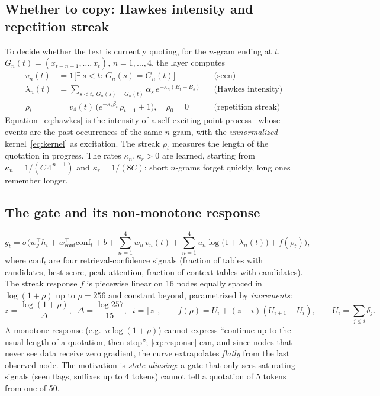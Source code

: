 \documentclass[11pt]{article}
\begin{document}
\subsection{Whether to copy: Hawkes intensity and repetition streak}
\label{sec:repetition}
To decide whether the text is currently quoting, for the $n$-gram ending at $t$, $G_n(t)=(x_{t-n+1},\dots,x_t)$,
$n=1,\dots,4$, the layer computes
\begin{align}
v_n(t)&=\mathbf{1}\big[\exists\,s<t:\,G_n(s)=G_n(t)\big] &&\text{(seen)}\\
\lambda_n(t)&=\sum_{s<t,\;G_n(s)=G_n(t)}\alpha_s\,e^{-\kappa_n(B_t-B_s)} &&\text{(Hawkes intensity)}\label{eq:hawkes}\\
\rho_t&=v_4(t)\,\big(e^{-\kappa_r\beta_t}\,\rho_{t-1}+1\big),\quad\rho_0=0 &&\text{(repetition streak)}\label{eq:streak}
\end{align}
Equation~\eqref{eq:hawkes} is the intensity of a self-exciting point process~\cite{hawkes1971spectra} whose events are
the past occurrences of the same $n$-gram, with the \emph{unnormalized} kernel~\eqref{eq:kernel} as excitation. The
streak $\rho_t$ measures the length of the quotation in progress. The rates $\kappa_n,\kappa_r>0$ are learned, starting
from $\kappa_n=1/(C\,4^{\,n-1})$ and $\kappa_r=1/(8C)$: short $n$-grams forget quickly, long ones remember longer.

\subsection{The gate and its non-monotone response}
\label{sec:gate}
\begin{equation}
g_t=\sigma\Big(w_g^\top h_t+w_{\mathrm{conf}}^\top\mathrm{conf}_t+b
+\sum_{n=1}^{4}w_n\,v_n(t)+\sum_{n=1}^{4}u_n\log\!\big(1+\lambda_n(t)\big)+f(\rho_t)\Big),
\end{equation}
where $\mathrm{conf}_t$ are four retrieval-confidence signals (fraction of tables with candidates, best score, peak
attention, fraction of context tables with candidates). The streak response $f$ is piecewise linear on 16 nodes equally
spaced in $\log(1+\rho)$ up to $\rho=256$ and constant beyond, parametrized by \emph{increments}:
\begin{equation}
z=\frac{\log(1+\rho)}{\Delta},\;\;\Delta=\frac{\log 257}{15},\;\;i=\lfloor z\rfloor,\qquad
f(\rho)=U_i+(z-i)(U_{i+1}-U_i),\qquad U_i=\sum_{j\le i}\delta_j .
\label{eq:response}
\end{equation}
A monotone response (e.g.\ $u\log(1+\rho)$) cannot express ``continue up to the usual length of a quotation, then
stop''; \eqref{eq:response} can, and since nodes that never see data receive zero gradient, the curve extrapolates
\emph{flatly} from the last observed node. The motivation is \emph{state aliasing}: a gate that only sees saturating
signals (seen flags, suffixes up to 4 tokens) cannot tell a quotation of 5 tokens from one of 50.
\end{document}
